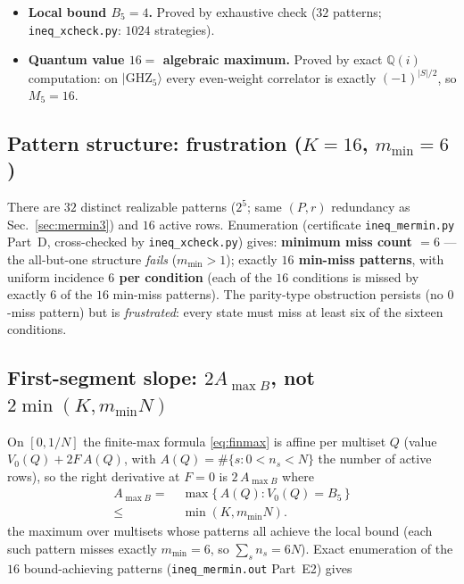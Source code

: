 \documentclass[aps,pra,reprint,superscriptaddress,floatfix]{revtex4-2}
\newcommand{\ket}[1]{\lvert #1\rangle}
\begin{document}
\begin{itemize}
\item \textbf{Local bound $B_{5}=4$.} Proved by exhaustive check ($32$
  patterns; \texttt{ineq\_xcheck.py}: $1024$ strategies).
\item \textbf{Quantum value $16=$ algebraic maximum.} Proved by exact
  $\mathbb{Q}(i)$ computation: on $\ket{\mathrm{GHZ}_{5}}$ every
  even-weight correlator is exactly $(-1)^{|S|/2}$, so $M_{5}=16$.
\end{itemize}

\subsection{Pattern structure: frustration ($K=16$, $m_{\min}=6$)}

There are $32$ distinct realizable patterns ($2^{5}$; same $(P,r)$
redundancy as Sec.~\ref{sec:mermin3}) and $16$ active rows. Enumeration
(certificate \texttt{ineq\_mermin.py} Part~D, cross-checked by
\texttt{ineq\_xcheck.py}) gives: \textbf{minimum miss count $=6$} --- the
all-but-one structure \emph{fails} ($m_{\min}>1$); exactly
\textbf{$16$ min-miss patterns}, with uniform incidence \textbf{$6$ per
condition} (each of the $16$ conditions is missed by exactly $6$ of the
$16$ min-miss patterns). The parity-type obstruction persists (no
$0$-miss pattern) but is \emph{frustrated}: every state must miss at
least six of the sixteen conditions.

\subsection{First-segment slope: $2A_{\max B}$, not $2\min(K,m_{\min}N)$}

On $[0,1/N]$ the finite-max formula \eqref{eq:finmax} is affine per
multiset $Q$ (value $V_{0}(Q)+2F\,A(Q)$, with
$A(Q)=\#\{s:0<n_{s}<N\}$ the number of active rows), so the right
derivative at $F=0$ is $2\,A_{\max B}$ where
\begin{equation*}
\begin{aligned}
A_{\max B}=\;&\max\{\,A(Q):V_{0}(Q)=B_{5}\,\}\\
\le\;&\min(K,m_{\min}N).
\end{aligned}
\end{equation*}
the maximum over multisets whose patterns all achieve the local bound
(each such pattern misses exactly $m_{\min}=6$, so $\sum_{s}n_{s}=6N$).
Exact enumeration of the $16$ bound-achieving patterns
(\texttt{ineq\_mermin.out} Part~E2) gives
\end{document}
